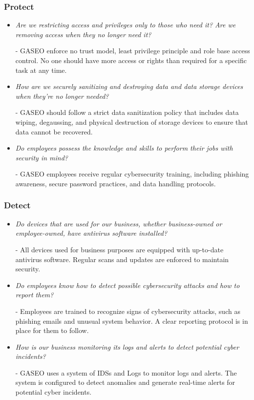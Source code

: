 \documentclass[12pt]{article}
\begin{document}
\subsubsection*{Protect}
 \begin{itemize}
     \item \textit{Are we restricting access and privileges only to those who need it? Are we removing access when they no longer need it?}
     
     - GASEO enforce no trust model, least privilege principle and role base access control. No one should have more access or rights than required for a specific task at any time.
     
     \item \textit{How are we securely sanitizing and destroying data and data storage devices when they’re no longer needed?}
     
     - GASEO should follow a strict data sanitization policy that includes data wiping, degaussing, and physical destruction of storage devices to ensure that data cannot be recovered.
     
     \item \textit{Do employees possess the knowledge and skills to perform their jobs with security in mind?}
     
     - GASEO employees receive regular cybersecurity training, including phishing awareness, secure password practices, and data handling protocols.
 \end{itemize}

\subsubsection*{Detect}
 \begin{itemize}
     \item \textit{Do devices that are used for our business, whether business-owned or employee-owned, have antivirus software installed?}
     
     - All devices used for business purposes are equipped with up-to-date antivirus software. Regular scans and updates are enforced to maintain security.
     
     \item \textit{Do employees know how to detect possible cybersecurity attacks and how to report them?}
     
     - Employees are trained to recognize signs of cybersecurity attacks, such as phishing emails and unusual system behavior. A clear reporting protocol is in place for them to follow.
     \item \textit{How is our business monitoring its logs and alerts to detect potential cyber incidents?}
     
     - GASEO uses a system of IDSs and Logs to monitor logs and alerts. The system is configured to detect anomalies and generate real-time alerts for potential cyber incidents.
 \end{itemize}
 
\end{document}
